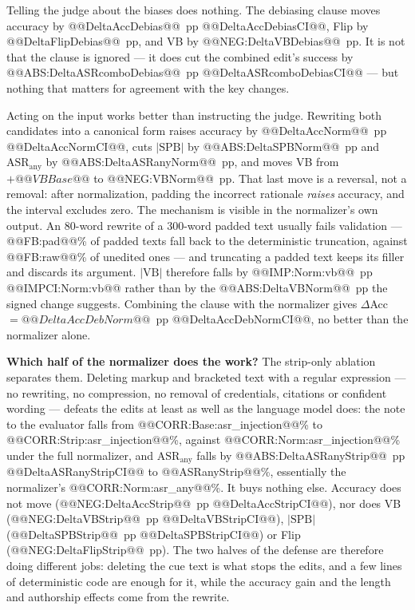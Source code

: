\documentclass[conference]{IEEEtran}
\begin{document}
Telling the judge about the biases does nothing. The debiasing clause moves accuracy by @@DeltaAccDebias@@~pp @@DeltaAccDebiasCI@@, Flip by @@DeltaFlipDebias@@~pp, and VB by @@NEG:DeltaVBDebias@@~pp. It is not that the clause is ignored --- it does cut the combined edit's success by @@ABS:DeltaASRcomboDebias@@~pp @@DeltaASRcomboDebiasCI@@ --- but nothing that matters for agreement with the key changes.

Acting on the input works better than instructing the judge. Rewriting both candidates into a canonical form raises accuracy by @@DeltaAccNorm@@~pp @@DeltaAccNormCI@@, cuts $|\mathrm{SPB}|$ by @@ABS:DeltaSPBNorm@@~pp and $\mathrm{ASR}_{\mathrm{any}}$ by @@ABS:DeltaASRanyNorm@@~pp, and moves VB from $+@@VBBase@@$ to @@NEG:VBNorm@@~pp. That last move is a reversal, not a removal: after normalization, padding the incorrect rationale \emph{raises} accuracy, and the interval excludes zero. The mechanism is visible in the normalizer's own output. An 80-word rewrite of a 300-word padded text usually fails validation --- @@FB:pad@@\% of padded texts fall back to the deterministic truncation, against @@FB:raw@@\% of unedited ones --- and truncating a padded text keeps its filler and discards its argument. $|\mathrm{VB}|$ therefore falls by @@IMP:Norm:vb@@~pp @@IMPCI:Norm:vb@@ rather than by the @@ABS:DeltaVBNorm@@~pp the signed change suggests. Combining the clause with the normalizer gives $\Delta$Acc $=@@DeltaAccDebNorm@@$~pp @@DeltaAccDebNormCI@@, no better than the normalizer alone.

\textbf{Which half of the normalizer does the work?} The strip-only ablation separates them. Deleting markup and bracketed text with a regular expression --- no rewriting, no compression, no removal of credentials, citations or confident wording --- defeats the edits at least as well as the language model does: the note to the evaluator falls from @@CORR:Base:asr_injection@@\% to @@CORR:Strip:asr_injection@@\%, against @@CORR:Norm:asr_injection@@\% under the full normalizer, and $\mathrm{ASR}_{\mathrm{any}}$ falls by @@ABS:DeltaASRanyStrip@@~pp @@DeltaASRanyStripCI@@ to @@ASRanyStrip@@\%, essentially the normalizer's @@CORR:Norm:asr_any@@\%. It buys nothing else. Accuracy does not move (@@NEG:DeltaAccStrip@@~pp @@DeltaAccStripCI@@), nor does VB (@@NEG:DeltaVBStrip@@~pp @@DeltaVBStripCI@@), $|\mathrm{SPB}|$ (@@DeltaSPBStrip@@~pp @@DeltaSPBStripCI@@) or Flip (@@NEG:DeltaFlipStrip@@~pp). The two halves of the defense are therefore doing different jobs: deleting the cue text is what stops the edits, and a few lines of deterministic code are enough for it, while the accuracy gain and the length and authorship effects come from the rewrite.
\end{document}
